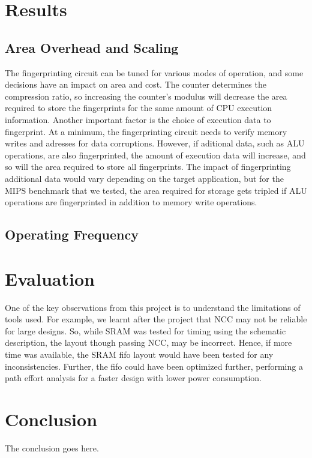 \documentclass[12pt,journal,compsoc]{IEEEtran}
\begin{document}
\section{Results}
\subsection{Area Overhead and Scaling}

The fingerprinting circuit can be tuned for various modes of operation, and some decisions have an impact on area and cost. The counter determines the compression ratio, so increasing the counter's modulus will decrease the area required to store the fingerprints for the same amount of CPU execution information. Another important factor is the choice of execution data to fingerprint. At a minimum, the fingerprinting circuit needs to verify memory writes and adresses for data corruptions. However, if aditional data, such as ALU operations, are also fingerprinted, the amount of execution data will increase, and so will the area required to store all fingerprints. The impact of fingerprinting additional data would vary depending on the target application, but for the MIPS benchmark that we tested, the area required for storage gets tripled if ALU operations are fingerprinted in addition to memory write operations. 

\subsection{Operating Frequency}
\section {Evaluation}
One of the key observations from this project is to understand the limitations of tools used. For example, we learnt after the project that NCC may not be reliable for large designs. So, while SRAM was tested for timing using the schematic description, the layout though passing NCC, may be incorrect. Hence, if more time was available, the SRAM fifo layout would have been tested for any inconsistencies. Further, the fifo could have been optimized further, performing a path effort analysis for a faster design with lower power consumption. 
\section{Conclusion}
The conclusion goes here.
\end{document}
